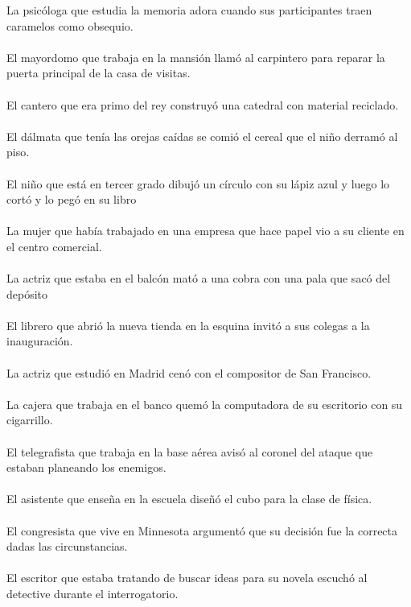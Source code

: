 La psic\'{o}loga que estudia la memoria adora cuando sus participantes traen caramelos como obsequio.	\\	\\
El mayordomo que trabaja en la mansi\'{o}n llam\'{o} al carpintero para reparar la puerta principal de la casa de visitas.	\\	\\
El cantero que era primo del rey construy\'{o} una catedral con material reciclado.	\\	\\
El d\'{a}lmata que ten\'{i}a las orejas ca\'{i}das se comi\'{o} el cereal que el ni\~{n}o derram\'{o} al piso.	\\	\\
El ni\~{n}o que est\'{a} en tercer grado dibuj\'{o} un c\'{i}rculo con su l\'{a}piz azul y luego lo cort\'{o} y lo peg\'{o} en su libro	\\	\\
La mujer que hab\'{i}a trabajado en una empresa que hace papel vio a su cliente en el centro comercial.	\\	\\
La actriz que estaba en el balc\'{o}n mat\'{o} a una cobra con una pala que sac\'{o} del dep\'{o}sito	\\	\\
El librero que abri\'{o} la nueva tienda en la esquina invit\'{o} a sus colegas a la inauguraci\'{o}n.	\\	\\
La actriz que estudi\'{o} en Madrid cen\'{o} con el compositor de San Francisco.	\\	\\
La cajera que trabaja en el banco quem\'{o} la computadora de su escritorio con su cigarrillo.	\\	\\
El telegrafista que trabaja en la base aérea avis\'{o} al coronel del ataque que estaban planeando los enemigos.	\\	\\
El asistente que ense\~{n}a en la escuela dise\~{n}\'{o} el cubo para la clase de f\'{i}sica.	\\	\\
El congresista que vive en Minnesota argument\'{o} que su decisi\'{o}n fue la correcta dadas las circunstancias.	\\	\\
El escritor que estaba tratando de buscar ideas para su novela escuch\'{o} al detective durante el interrogatorio.	\\	\\
